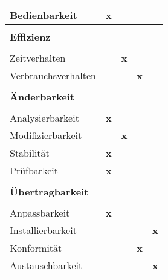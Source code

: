 \begin{table}[H]
\begin{tabular}{|lcccc|}
Bedienbarkeit         & \textbf{x}        &     &        &                \\[0.1cm] \hline &&&& \\[-0.4cm]
\textbf{Effizienz}    &&&&								         		  \\[0.1cm] \hline &&&& \\[-0.4cm]
Zeitverhalten         &          & \textbf{x}   &        &                \\[0.1cm]
Verbrauchsverhalten   &          &     & \textbf{x}      &                \\[0.1cm] \hline &&&& \\[-0.4cm]
\textbf{Änderbarkeit} &&&&						                 		  \\[0.1cm] \hline &&&& \\[-0.4cm]
Analysierbarkeit      & \textbf{x}        &     &        &                \\[0.1cm]
Modifizierbarkeit     &          & \textbf{x}   &        &                \\[0.1cm]
Stabilität            & \textbf{x}        &     &        &                \\[0.1cm]
Prüfbarkeit           & \textbf{x}        &     &        &                \\[0.1cm] \hline &&&& \\[-0.4cm]
\textbf{Übertragbarkeit} &&&&							         		  \\[0.1cm] \hline &&&& \\[-0.4cm]
Anpassbarkeit         & \textbf{x}        &     &        &                \\[0.1cm]
Installierbarkeit     &          &     &        & \textbf{x}              \\[0.1cm]
Konformität           &          &     & \textbf{x}      &                \\[0.1cm]
Austauschbarkeit      &          &     &        & \textbf{x}              \\ \hline
\end{tabular}
\end{table}

